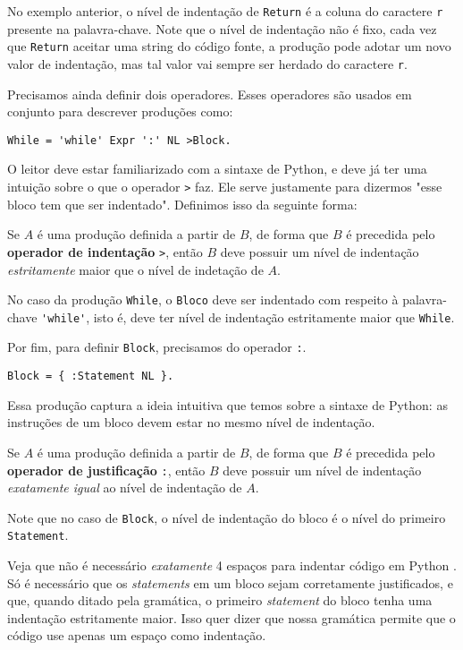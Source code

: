 No exemplo anterior, o nível de indentação de \verb|Return|
é a coluna do caractere \verb|r| presente na palavra-chave.
Note que o nível de indentação não é fixo,
cada vez que \verb|Return| aceitar uma string do código fonte,
a produção pode adotar um novo valor de indentação,
mas tal valor vai sempre ser herdado do caractere \verb|r|.

Precisamos ainda definir dois operadores. Esses operadores
são usados em conjunto para descrever produções como:

\begin{lstlisting}
While = 'while' Expr ':' NL >Block.
\end{lstlisting}

O leitor deve estar familiarizado
com a sintaxe de Python, e deve
já ter uma intuição sobre o que o operador \verb|>| faz.
Ele serve justamente para dizermos "esse bloco tem que ser
indentado". Definimos isso da seguinte forma:

\begin{Def}
Se \(A\) é uma produção definida a partir de \(B\),
de forma que \(B\) é 
precedida pelo \textbf{operador de indentação} \verb|>|, 
então \(B\) deve possuir
um nível de indentação \emph{estritamente}
maior que o nível de indetação de \(A\).
\end{Def}

No caso da produção \verb|While|, o \verb|Bloco|
deve ser indentado
com respeito à palavra-chave \verb|'while'|, isto é,
deve ter nível de indentação estritamente maior
que \verb|While|.

Por fim, para definir \verb|Block|, precisamos do operador
\verb|:|.

\begin{lstlisting}
Block = { :Statement NL }.
\end{lstlisting}

\noindent Essa produção captura a ideia intuitiva que temos
sobre a sintaxe de Python: as instruções de um bloco
devem estar no mesmo nível de indentação.

\begin{Def}
Se \(A\) é uma produção definida a partir de \(B\),
de forma que \(B\) é 
precedida pelo \textbf{operador de justificação} \verb|:|, 
então \(B\) deve possuir
um nível de indentação \emph{exatamente igual}
ao nível de indentação de \(A\).
\end{Def}

Note que no caso de \verb|Block|, o nível de indentação
do bloco é o nível do primeiro \verb|Statement|.

Veja que não é necessário \emph{exatamente} 4 espaços para
indentar código em Python \cite{indentation}. Só é necessário
que os \textit{statements}
em um bloco sejam corretamente justificados, e que, quando
ditado pela gramática, o primeiro \textit{statement}
do bloco tenha uma
indentação estritamente maior.
Isso quer dizer que nossa gramática permite
que o código use apenas um espaço como indentação.